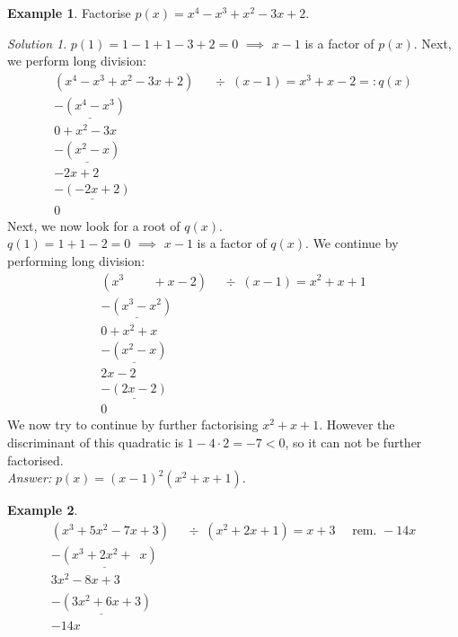 \documentclass[
  12pt,
  oneside]{book}
\theoremstyle{definition}
\theoremstyle{definition}
\newtheorem{example}{Example}[chapter]
\theoremstyle{definition}
\theoremstyle{definition}
\theoremstyle{remark}
\newtheorem*{solution}{Solution}
\begin{document}
\begin{example}
Factorise \(p(x)=x^4-x^3+x^2-3x+2\).
\end{example}

\begin{solution}
\(p(1)=1-1+1-3+2=0\) \(\implies\) \(x-1\) is a factor of \(p(x)\). Next, we perform long division:
\[
\begin{array}{rl}
(x^4-x^3+x^2-3x+2) & \div \,\,\,(x-1) = x^3+x-2 =: q(x)\\
\underline{-(x^4-x^3)}\phantom{+x^2-3x+2x}\\
0 + x^2-3x\phantom{+2m}\\
\underline{-(x^2-x)}\phantom{+2x}\\
-2x+2\phantom{x}\\
\underline{-(-2x+2)}\\
0\phantom{x}
\end{array}
\]
Next, we now look for a root of \(q(x)\).\\
\(q(1) = 1+1-2=0\) \(\implies\) \(x-1\) is a factor of \(q(x)\). We continue by performing long division:
\[
\begin{array}{rl}
(x^3\phantom{-xm}+x-2) & \div \,\,\,(x-1) = x^2+x+1\\
\underline{-(x^3-x^2)}\phantom{x+2xx}\\
0 + x^2+x\phantom{+2m}\\
\underline{-(x^2-x)}\phantom{+2x}\\
 2x-2\phantom{x}\\
\underline{-(2x-2)}\\
0\phantom{x}
\end{array}
\]
We now try to continue by further factorising \(x^2+x+1\). However the discriminant of this quadratic is \(1-4\cdot2=-7<0\), so it can not be further factorised.\\
\emph{Answer:} \(p(x)=(x-1)^2(x^2+x+1)\).
\end{solution}

\begin{example}
\[
\begin{array}{rl}
(x^3+5x^2-7x+3) &\div\,\,\,(x^2+2x+1) = x+3\quad\text{ rem. }-14x\\
\underline{-(x^3+2x^2+\phantom{7}x)}\phantom{+3)}\\
3x^2-8x+3\phantom{)}\\
\underline{-(3x^2+6x+3)}\\
-14x\phantom{+3m}
\end{array}
\]
\end{example}
\end{document}
